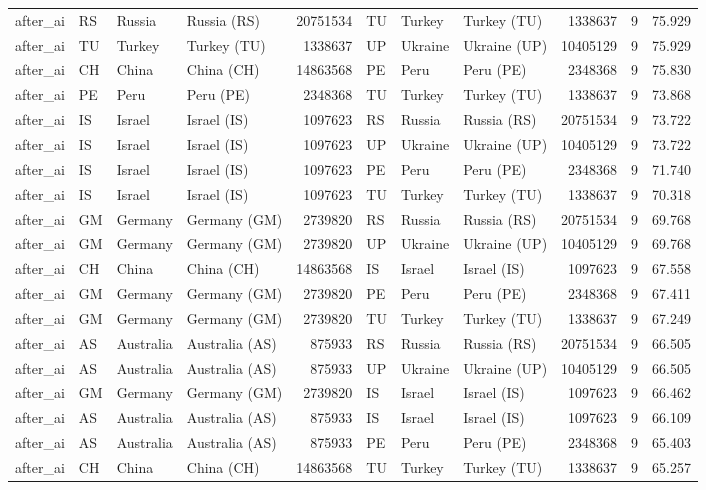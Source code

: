 \begin{tabular}{llllrlllrrr}
after\_ai & RS & Russia & Russia (RS) & 20751534 & TU & Turkey & Turkey (TU) & 1338637 & 9 & 75.929 \\
after\_ai & TU & Turkey & Turkey (TU) & 1338637 & UP & Ukraine & Ukraine (UP) & 10405129 & 9 & 75.929 \\
after\_ai & CH & China & China (CH) & 14863568 & PE & Peru & Peru (PE) & 2348368 & 9 & 75.830 \\
after\_ai & PE & Peru & Peru (PE) & 2348368 & TU & Turkey & Turkey (TU) & 1338637 & 9 & 73.868 \\
after\_ai & IS & Israel & Israel (IS) & 1097623 & RS & Russia & Russia (RS) & 20751534 & 9 & 73.722 \\
after\_ai & IS & Israel & Israel (IS) & 1097623 & UP & Ukraine & Ukraine (UP) & 10405129 & 9 & 73.722 \\
after\_ai & IS & Israel & Israel (IS) & 1097623 & PE & Peru & Peru (PE) & 2348368 & 9 & 71.740 \\
after\_ai & IS & Israel & Israel (IS) & 1097623 & TU & Turkey & Turkey (TU) & 1338637 & 9 & 70.318 \\
after\_ai & GM & Germany & Germany (GM) & 2739820 & RS & Russia & Russia (RS) & 20751534 & 9 & 69.768 \\
after\_ai & GM & Germany & Germany (GM) & 2739820 & UP & Ukraine & Ukraine (UP) & 10405129 & 9 & 69.768 \\
after\_ai & CH & China & China (CH) & 14863568 & IS & Israel & Israel (IS) & 1097623 & 9 & 67.558 \\
after\_ai & GM & Germany & Germany (GM) & 2739820 & PE & Peru & Peru (PE) & 2348368 & 9 & 67.411 \\
after\_ai & GM & Germany & Germany (GM) & 2739820 & TU & Turkey & Turkey (TU) & 1338637 & 9 & 67.249 \\
after\_ai & AS & Australia & Australia (AS) & 875933 & RS & Russia & Russia (RS) & 20751534 & 9 & 66.505 \\
after\_ai & AS & Australia & Australia (AS) & 875933 & UP & Ukraine & Ukraine (UP) & 10405129 & 9 & 66.505 \\
after\_ai & GM & Germany & Germany (GM) & 2739820 & IS & Israel & Israel (IS) & 1097623 & 9 & 66.462 \\
after\_ai & AS & Australia & Australia (AS) & 875933 & IS & Israel & Israel (IS) & 1097623 & 9 & 66.109 \\
after\_ai & AS & Australia & Australia (AS) & 875933 & PE & Peru & Peru (PE) & 2348368 & 9 & 65.403 \\
after\_ai & CH & China & China (CH) & 14863568 & TU & Turkey & Turkey (TU) & 1338637 & 9 & 65.257 \\

\end{tabular}
